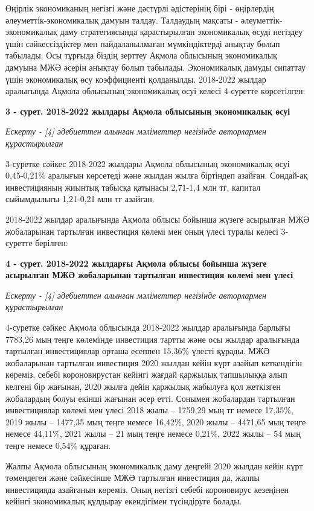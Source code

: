 Өңірлік экономиканың негізгі және дәстүрлі әдістерінің бірі - өңірлердің
әлеуметтік-экономикалық дамуын талдау. Талдаудың мақсаты -
әлеуметтік-экономикалық даму стратегиясында қарастырылған экономикалық
өсуді негіздеу үшін сәйкессіздіктер мен пайдаланылмаған мүмкіндіктерді
анықтау болып табылады. Осы тұрғыда біздің зерттеу Ақмола облысының
экономикалық дамуына МЖӘ әсерін анықтау болып табылады. Экономикалық
дамуды сипаттау үшін экономикалық өсу коэффициенті қолданылды. 2018-2022
жылдар аралығында Ақмола облысының экономикалық өсуі келесі 4-суретте
көрсетілген:

{\bfseries 3 - сурет. 2018-2022 жылдары Ақмола облысының экономикалық өсуі}

\emph{Ескерту - {[}4{]} әдебиеттен алынған мәліметтер негізінде
авторлармен құрастырылған}

3-суретке сәйкес 2018-2022 жылдары Ақмола облысының экономикалық өсуі
0,45-0,21\% аралығын көрсетеді және жылдан жылға біртіндеп азайған.
Сондай-ақ инвестицияның жиынтық табысқа қатынасы 2,71-1,4 млн тг,
капитал сыйымдылығы 1,21-0,21 млн тг азайған.

2018-2022 жылдар аралығында Ақмола облысы бойынша жүзеге асырылған МЖӘ
жобаларынан тартылған инвестиция көлемі мен оның үлесі туралы келесі
3-суретте берілген:

{\bfseries 4 - сурет. 2018-2022 жылдарғы Ақмола облысы бойынша жүзеге
асырылған МЖӘ жобаларынан тартылған инвестиция көлемі мен үлесі}

\emph{Ескерту - {[}4{]} әдебиеттен алынған мәліметтер негізінде
авторлармен құрастырылған}

4-суретке сәйкес Ақмола облысында 2018-2022 жылдар аралығында барлығы
7783,26 мың теңге көлемінде инвестиция тартты және осы жылдар аралығында
тартылған инвестициялар орташа есеппен 15,36\% үлесті құрады. МЖӘ
жобаларынан тартылған инвестиция 2020 жылдан кейін күрт азайып
кеткендігін көреміз, себебі короновирустан кейінгі жағдай қаржылық
тапшылыққа алып келгені бір жағынан, 2020 жылға дейін қаржылық жабылуға
қол жеткізген жобалардың болуы екінші жағынан әсер етті. Сонымен
жобалардан тартылған инвестициялар көлемі мен үлесі 2018 жылы -- 1759,29
мың тг немесе 17,35\%, 2019 жылы -- 1477,35 мың теңге немесе 16,42\%,
2020 жылы -- 4471,65 мың теңге немесе 44,11\%, 2021 жылы -- 21 мың теңге
немесе 0,21\%, 2022 жылы -- 54 мың теңге немесе 0,54\% құраған.

Жалпы Ақмола облысының экономикалық даму деңгейі 2020 жылдан кейін күрт
төмендеген және сәйкесінше МЖӘ тартылған инвестиция да, жалпы
инвестицияда азайғанын көреміз. Оның негізгі себебі короновирус
кезеңінен кейінгі экономикалық құлдырау екендігімен түсіндіруге болады.

